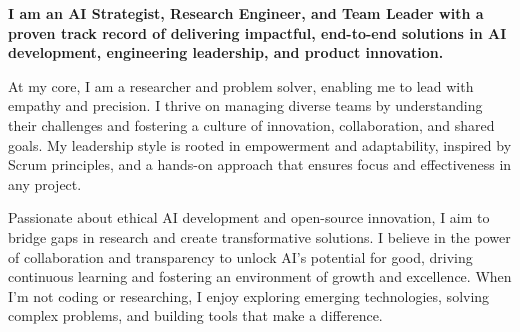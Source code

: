 \documentclass[a4paper,12pt]{article}
\begin{document}
\begin{tcolorbox}[colback=white, colframe=white, boxrule=0pt, arc=0mm, boxsep=0mm, width=\textwidth]
\begin{minipage}[t]{0.7\textwidth}
        \textbf{I am an AI Strategist, Research Engineer, and Team Leader with a proven track record of delivering impactful, end-to-end solutions in AI development, engineering leadership, and product innovation.}
        \vspace{2em}

        At my core, I am a researcher and problem solver, enabling me to lead with
        empathy and precision. I thrive on managing diverse teams by understanding
        their challenges and fostering a culture of innovation, collaboration, and
        shared goals. My leadership style is rooted in empowerment and adaptability,
        inspired by Scrum principles, and a hands-on approach that ensures focus and
        effectiveness in any project.

        \vspace{1em}

        Passionate about ethical AI development and open-source innovation, I aim to
        bridge gaps in research and create transformative solutions. I believe in the
        power of collaboration and transparency to unlock AI's potential for good,
        driving continuous learning and fostering an environment of growth and
        excellence. When I’m not coding or researching, I enjoy exploring emerging
        technologies, solving complex problems, and building tools that make a
        difference.
    \end{minipage}
\end{tcolorbox}
\end{document}
